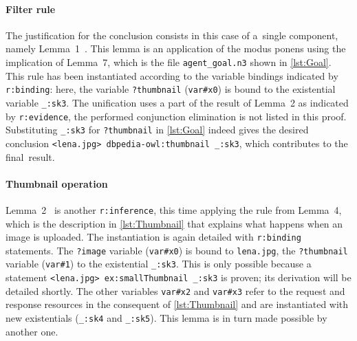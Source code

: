 \vspace{-1em}

\paragraph{\bfseries Filter rule}
The justification for the conclusion
consists in this case of a~single component, namely Lemma~1~.
This lemma is an application of the modus ponens using the implication of Lemma~7,
which is the file \verb!agent_goal.n3! shown in \cref{lst:Goal}.
This rule has been instantiated 
according to the variable bindings indicated by \verb!r:binding!:
here, the variable \verb!?thumbnail! (\verb!var#x0!)
is bound to the existential variable \verb!_:sk3!.
The unification uses a part of the result of Lemma~2 as indicated by \verb!r:evidence!, the performed conjunction elimination is not listed in this proof.
\sloppy Substituting \verb!_:sk3! for \verb!?thumbnail! in \cref{lst:Goal}
indeed gives the desired conclusion
\verb!<lena.jpg> dbpedia-owl:thumbnail _:sk3!,
which contributes to the final~result.

\vspace{-1em}

\paragraph{\bfseries Thumbnail operation}
Lemma~2~ is another \verb!r:inference!,
this time applying the rule from Lemma~4,
which is the \restdesc description in \cref{lst:Thumbnail}
that explains what happens when an image is uploaded. 
The instantiation is again detailed with \verb!r:binding! statements.
The \verb!?image! variable (\verb!var#x0!) is bound to \verb!lena.jpg!,
the \verb!?thumbnail! variable (\verb!var#1!) to the existential \verb!_:sk3!.
This is only possible because a~ statement
\verb!<lena.jpg> ex:smallThumbnail _:sk3! is proven; 
its derivation will be detailed shortly.
The other variables \verb!var#x2! and \verb!var#x3!
refer to the request and response resources in the consequent of \cref{lst:Thumbnail}
and are instantiated with new existentials (\verb!_:sk4! and \verb!_:sk5!).
This lemma is in turn made possible by another one.

\vspace{-1em}

